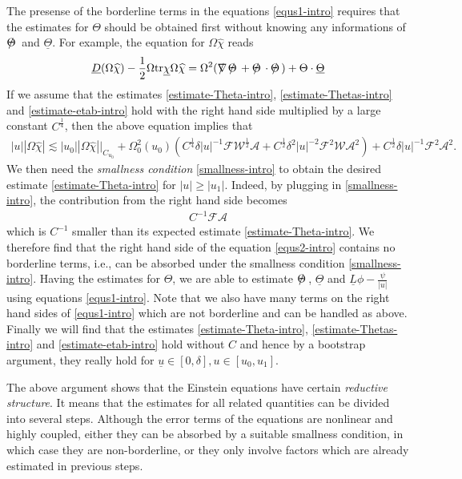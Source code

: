 \documentclass[11pt,reqno]{amsart}
\theoremstyle{definition}
\numberwithin{equation}{section}
\newcommand{\tr}{\mathrm{tr}}
\def\chib{\underline{\chi}}
\def\chih{\widehat{\chi}}
\def\Lb{\underline{L}}
\def\tr{\mathrm{tr}}
\def\ub{\underline{u}}
\newcommand{\Db}{\underline{D}}
\def\nablas{\mbox{$\nabla \mkern -13mu /$ }}
\def\Thetas{\mbox{$\Theta \mkern -12mu /$ }}
\begin{document}
The presense of the borderline terms in the equations \eqref{equs1-intro} requires that the estimates for $\Theta$ should be obtained first without knowing any informations of $\Thetas$ and $\underline{\Theta}$. For example, the equation for $\Omega\chih$ reads
\begin{align}\label{equs2-intro}
\Db(\Omega\chih)-\frac{1}{2}\Omega\tr\chib\Omega\chih=\Omega^2(\nablas\Thetas+\Thetas\cdot\Thetas)+\Theta\cdot\underline{\Theta}
\end{align}
If we assume that the estimates \eqref{estimate-Theta-intro}, \eqref{estimate-Thetas-intro} and \eqref{estimate-etab-intro} hold with the right hand side multiplied by a large constant $C^{\frac{1}{4}}$, then the above equation implies that
\begin{align*}
|u||\Omega\chih|\lesssim|u_0||\Omega\chih|\Big|_{C_{u_0}}+\Omega_0^2(u_0)( C^{\frac{1}{4}}\delta|u|^{-1}\mathscr{F}\mathscr{W}^{\frac{1}{2}}\mathcal{A}+ C^{\frac{1}{2}}\delta^2|u|^{-2}\mathscr{F}^2\mathscr{W}\mathcal{A}^2)+ C^{\frac{1}{2}}\delta|u|^{-1}\mathscr{F}^2\mathcal{A}^2.
\end{align*}
We then need the \emph{smallness condition} \eqref{smallness-intro} to obtain the desired estimate \eqref{estimate-Theta-intro} for $|u|\ge|u_1|$. Indeed, by plugging in \eqref{smallness-intro}, the contribution from the right hand side becomes
\begin{align*}
C^{-1}\mathscr{F}\mathcal{A}
\end{align*}
which is $C^{-1}$ smaller than its expected estimate \eqref{estimate-Theta-intro}. We therefore find that the right hand side of the equation \eqref{equs2-intro} contains no borderline terms, i.e., can be absorbed under the smallness condition \eqref{smallness-intro}. Having the estimates for $\Theta$, we are able to estimate $\Thetas$, $\underline{\Theta}$ and $\Lb\phi-\frac{\psi}{|u|}$ using equations \eqref{equs1-intro}. Note that we also have many terms on the right hand sides of \eqref{equs1-intro} which are not borderline and can be handled as above. Finally we will find that the estimates \eqref{estimate-Theta-intro}, \eqref{estimate-Thetas-intro} and \eqref{estimate-etab-intro} hold without $C$ and hence by a bootstrap argument, they really hold for $\ub\in[0,\delta], u\in[u_0,u_1]$.

The above argument shows that the Einstein equations have certain \emph{reductive structure}. It means that the estimates for all related quantities can be divided into several steps. Although the error terms of the equations are nonlinear and highly coupled, either they can be absorbed by a suitable smallness condition, in which case they are non-borderline, or they only involve factors which are already estimated in previous steps.
\end{document}

